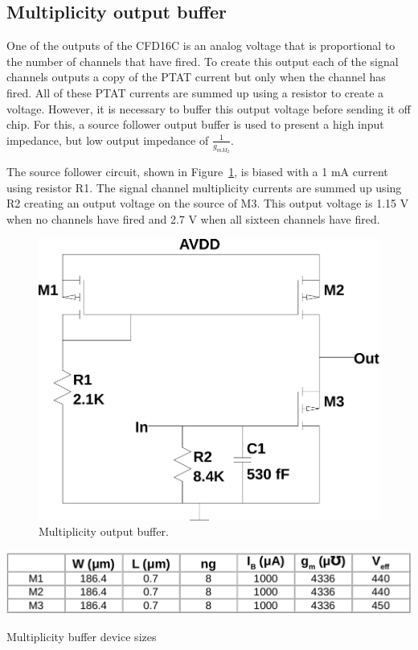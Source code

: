 \documentclass[12pt,oneside,final]{siuethesis}
\theoremstyle{definition}
\begin{document}
\subsection{Multiplicity output buffer}
\par One of the outputs of the CFD16C is an analog voltage that is proportional to the number of channels that have fired. To create this output each of the signal channels outputs a copy of the PTAT current but only when the channel has fired. All of these PTAT currents are summed up using a resistor to create a voltage. However, it is necessary to buffer this output voltage before sending it off chip. For this, a source follower output buffer is used to present a high input impedance, but low output impedance of $\frac{1}{g_{m M_{2}}}$. 
\par The source follower circuit, shown in Figure~\ref{fig:mult}, is biased with a 1 mA current using resistor R1. The signal channel multiplicity currents are summed up using R2 creating an output voltage on the source of M3. This output voltage is 1.15 V when no channels have fired and 2.7 V when all sixteen channels have fired. 

\begin{figure}[htbp!]
\centering
\includegraphics[scale=.45,keepaspectratio=true]{../LTspice_Drawings/multiplicity/mult_buffer.png} 
\caption{Multiplicity output buffer.}
\label{fig:mult}
\end{figure}

\begin{table}[htbp!]
 \centering
 \includegraphics[scale=.4,keepaspectratio=true]{./ch3_figures/mult_sizes.png}
 \caption{Multiplicity buffer device sizes}
 \label{tab:mult-sizes}
\end{table}
\end{document}
